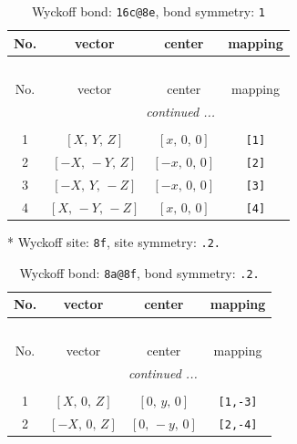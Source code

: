 \documentclass[fleqn,8pt]{jsarticle}
\begin{document}
\begin{longtable}{cccc}
\caption{Wyckoff bond: {\tt 16c@8e}, bond symmetry: {\tt 1}}
 \\
 \hline \hline
No. & vector & center & mapping \\ \hline \endfirsthead

\multicolumn{3}{l}{\tablename\ \thetable{}} \\
 \hline \hline
No. & vector & center & mapping \\ \hline \endhead

 \hline \hline
\multicolumn{3}{r}{\footnotesize\it continued ...} \\ \endfoot

 \hline \hline
\multicolumn{3}{r}{} \\ \endlastfoot

1 & $\left[ X,\, Y,\, Z \right]$ & $\left[ x,\, 0,\, 0 \right]$ & {\tt [1]} \\ \hline
2 & $\left[ - X,\, - Y,\, Z \right]$ & $\left[ - x,\, 0,\, 0 \right]$ & {\tt [2]} \\ \hline
3 & $\left[ - X,\, Y,\, - Z \right]$ & $\left[ - x,\, 0,\, 0 \right]$ & {\tt [3]} \\ \hline
4 & $\left[ X,\, - Y,\, - Z \right]$ & $\left[ x,\, 0,\, 0 \right]$ & {\tt [4]} \\
\end{longtable}
* Wyckoff site: {\tt 8f}, site symmetry: {\tt .2.}
\renewcommand{\arraystretch}{1.2}
\begin{longtable}{cccc}
\caption{Wyckoff bond: {\tt 8a@8f}, bond symmetry: {\tt .2.}}
 \\
 \hline \hline
No. & vector & center & mapping \\ \hline \endfirsthead

\multicolumn{3}{l}{\tablename\ \thetable{}} \\
 \hline \hline
No. & vector & center & mapping \\ \hline \endhead

 \hline \hline
\multicolumn{3}{r}{\footnotesize\it continued ...} \\ \endfoot

 \hline \hline
\multicolumn{3}{r}{} \\ \endlastfoot

1 & $\left[ X,\, 0,\, Z \right]$ & $\left[ 0,\, y,\, 0 \right]$ & {\tt [1,-3]} \\ \hline
2 & $\left[ - X,\, 0,\, Z \right]$ & $\left[ 0,\, - y,\, 0 \right]$ & {\tt [2,-4]} \\
\end{longtable}
\end{document}
